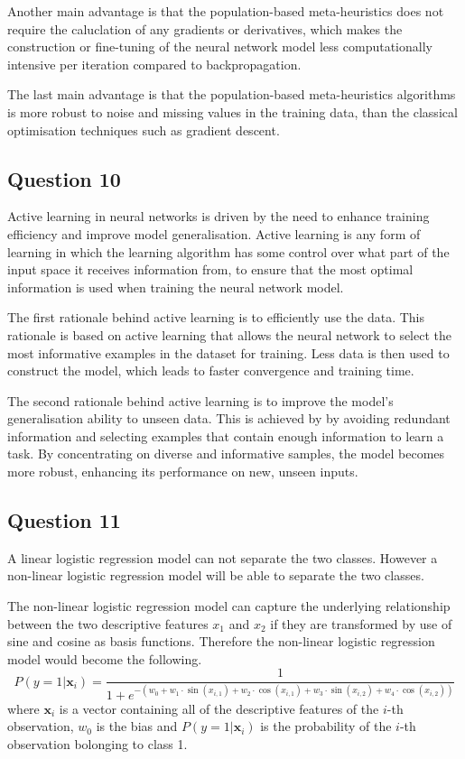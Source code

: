 \documentclass[10pt]{article}
\begin{document}
Another main advantage is that the population-based meta-heuristics does not require the caluclation of any gradients
or derivatives, which makes the construction or fine-tuning of the neural network model less computationally intensive
per iteration compared to backpropagation.

The last main advantage is that the population-based meta-heuristics algorithms is more robust to noise and missing
values in the training data, than the classical optimisation techniques such as gradient descent.

\subsection*{Question 10}

Active learning in neural networks is driven by the need to enhance training efficiency and improve model
generalisation. Active learning is any form of learning in which the learning algorithm has some control
over what part of the input space it receives information from, to ensure that the most optimal information
is used when training the neural network model.

The first rationale behind active learning is to efficiently use the data. This rationale
is based on active learning that allows the neural network to select the most informative examples in the
dataset for training. Less data is then used to construct the model, which leads to faster convergence and
training time.

The second rationale behind active learning is to improve the model's generalisation ability to unseen data.
This is achieved by by avoiding redundant information and selecting examples that contain enough information
to learn a task. By concentrating on diverse and informative samples, the model becomes more robust, enhancing
its performance on new, unseen inputs.

\subsection*{Question 11}

A linear logistic regression model can not separate the two classes. However a non-linear logistic regression
model will be able to separate the two classes.

The non-linear logistic regression model can capture the underlying relationship between the two
descriptive features $x_1$ and $x_2$ if they are transformed by use of sine and cosine as basis functions. Therefore
the non-linear logistic regression model would become the following.
\begin{equation}
    P(y=1|\boldsymbol{x}_i) = \frac{1}{1 + e^{-(w_0 + w_1 \cdot \sin(x_{i,1}) + w_2 \cdot \cos(x_{i,1}) + w_3 \cdot \sin(x_{i,2}) + w_4 \cdot \cos(x_{i,2}))}}
\end{equation}
where $\boldsymbol{x}_i$ is a vector containing all of the descriptive features of the $i$-th observation, $w_0$ is
the bias and $P(y=1|\boldsymbol{x}_i)$ is the probability of the $i$-th observation bolonging to class 1.
\end{document}
